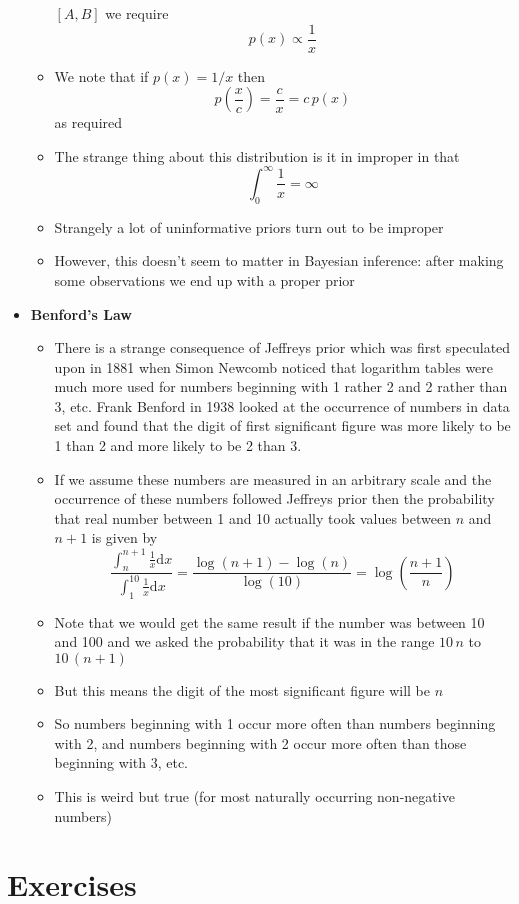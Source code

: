 \documentclass[11pt]{article}
\newcommand{\logg}[1]{\log\!\left( #1 \right)}
\newcommand{\dd}{\mathrm{d}}
\begin{document}
\begin{itemize}
\begin{itemize}
\([A,B]\) we require
$$ p(x) \propto \frac{1}{x} $$
\item We note that if \(p(x)=1/x\) then
$$ p\!\left(\frac{x}{c}\right)  = \frac{c}{x} = c \, p(x) $$
as required
\item The strange thing about this distribution is it in improper in
that 
$$ \int_0^\infty \frac{1}{x} = \infty $$
\item Strangely a lot of uninformative priors turn out to be improper
\item However, this doesn't seem to matter in Bayesian inference:
after making some observations we end up with a proper prior
\end{itemize}
\item \textbf{Benford's Law}
\begin{itemize}
\item There is a strange consequence of Jeffreys prior which was
first speculated upon in 1881 when Simon Newcomb noticed that
logarithm tables were much more used for numbers beginning with
1 rather 2 and 2 rather than 3, etc.  Frank Benford in 1938
looked at the occurrence of numbers in data set and found that
the digit of first significant figure was more likely to be 1
than 2 and more likely to be 2 than 3.
\item If we assume these numbers are measured in an arbitrary scale
and the occurrence of these numbers followed Jeffreys prior
then the probability that real number between 1 and 10 actually
took values between \(n\) and \(n+1\) is given by
$$ \frac{\int_n^{n+1} \frac{1}{x} \dd x}{\int_1^{10} \frac{1}{x}
       \dd x} = \frac{\log(n+1) - \log(n)}{\log(10)} =
       \logg{\frac{n+1}{n}} $$
\item Note that we would get the same result if the number was
between 10 and 100 and we asked the probability that it was in
the range \(10\,n\) to \(10\,(n+1)\)
\item But this means the digit of the most significant figure will be \(n\)
\item So numbers beginning with 1 occur more often than numbers
beginning with 2, and numbers beginning with 2 occur more often
than those beginning with 3, etc.
\item This is weird but true (for most naturally occurring
non-negative numbers)
\end{itemize}
\end{itemize}


\section{Exercises}
\label{sec:orga0989b1}
\end{document}
